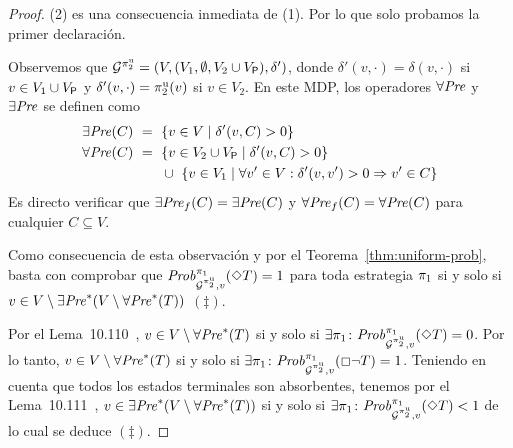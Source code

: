 \begin{proof}
  (2) es una consecuencia inmediata de (1). Por lo que solo probamos la primer declaración.

  Observemos que 
  $\mathcal{G}^{\pi^{\mathrm{u}}_{2}} = (V, (V_1, \emptyset, {V_2 \cup V_{\mathsf{P}}}), \delta')$,
  donde $\delta'(v,\cdot)=\delta(v,\cdot)$ si $v\in V_1\cup V_{\mathsf{P}}$
  y $\delta'(v,\cdot)=\pi^{\mathrm{u}}_{2}(v)$ si $v\in V_2$.
  En este MDP, los operadores $\forall\mathit{Pre}$ y $\exists\mathit{Pre}$ se definen como
  \begin{align*}
    \exists\mathit{Pre}(C) \ = \ {}&\{ v \in V \mid \delta'(v,C) > 0\} \\
    \forall\mathit{Pre}(C) \ = \ {}&\{ v \in V_2\cup V_{\mathsf{P}} \mid \delta'(v,C) > 0\} \\
		     &\cup \ \{ v \in  V_1 \mid \forall v' \in V : \delta'(v,v') > 0 \Rightarrow v' \in C \}
  \end{align*}
  Es directo verificar que $\exists\mathit{Pre}_f(C)=\exists\mathit{Pre}(C)$ y
  $\forall\mathit{Pre}_f(C)=\forall\mathit{Pre}(C)$ para cualquier $C\subseteq V$.

  Como consecuencia de esta observación y por el Teorema~\ref{thm:uniform-prob}, basta con comprobar que
  $\mathit{Prob}^{\pi_{1}}_{\mathcal{G}^{\pi^{\mathrm{u}}_{2}},v}(\Diamond T)=1$ para toda estrategia $\pi_{1}$ si y solo si
  $v \in V\setminus \exists\mathit{Pre}^*(V \setminus \forall\mathit{Pre}^*(T))$ $(\ddag)$.

  Por el Lema~10.110~\cite{BaierK08}, $v\in V \setminus \forall\mathit{Pre}^*(T)$ si y solo si
  $\exists \pi_{1}\colon \mathit{Prob}^{\pi_{1}}_{\mathcal{G}^{\pi^{\mathrm{u}}_{2}},v}(\Diamond T) = 0$.
  Por lo tanto, $v\in V \setminus \forall\mathit{Pre}^*(T)$ si y solo si
  $\exists \pi_{1}\colon \mathit{Prob}^{\pi_{1}}_{\mathcal{G}^{\pi^{\mathrm{u}}_{2}},v}(\Box \neg T) = 1$.
  Teniendo en cuenta que todos los estados terminales son absorbentes, tenemos por el Lema~10.111~\cite{BaierK08}, $v\in \exists\mathit{Pre}^*(V \setminus \forall\mathit{Pre}^*(T))$ si y solo si
  $\exists \pi_{1}\colon \mathit{Prob}^{\pi_{1}}_{\mathcal{G}^{\pi^{\mathrm{u}}_{2}},v}(\Diamond T) < 1$
  de lo cual se deduce $(\ddag)$.
  \qedhere
\end{proof}





